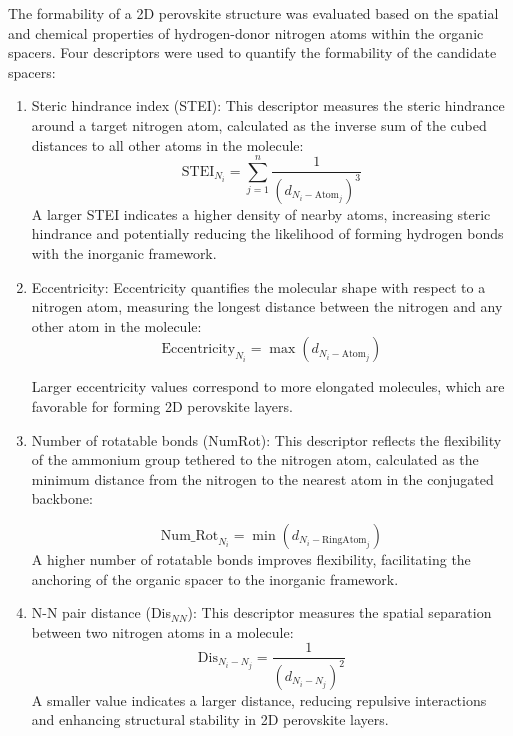 The formability of a 2D perovskite structure was evaluated based on the spatial and chemical properties of hydrogen-donor nitrogen atoms within the organic spacers. Four descriptors were used to quantify the formability of the candidate spacers:
\begin{enumerate}

    \item Steric hindrance index (STEI): This descriptor measures the steric hindrance around a target nitrogen atom, calculated as the inverse sum of the cubed distances to all other atoms in the molecule:
    \begin{equation}
        \text{STEI}_{N_i} = \sum_{j=1}^n \frac{1}{\left(d_{N_i - \text{Atom}_j}\right)^3}
    \end{equation}
A larger STEI indicates a higher density of nearby atoms, increasing steric hindrance and potentially reducing the likelihood of forming hydrogen bonds with the inorganic framework.
    \item Eccentricity: Eccentricity quantifies the molecular shape with respect to a nitrogen atom, measuring the longest distance between the nitrogen and any other atom in the molecule:
    \begin{equation}
        \text{Eccentricity}_{N_i} = \max\left(d_{N_i - \text{Atom}_j}\right)
    \end{equation}

Larger eccentricity values correspond to more elongated molecules, which are favorable for forming 2D perovskite layers.
	\item Number of rotatable bonds (NumRot): This descriptor reflects the flexibility of the ammonium group tethered to the nitrogen atom, calculated as the minimum distance from the nitrogen to the nearest atom in the conjugated backbone:

    \begin{equation}
        \text{Num\_Rot}_{N_i} = \min\left(d_{N_i - \text{RingAtom}_j}\right)
    \end{equation}
A higher number of rotatable bonds improves flexibility, facilitating the anchoring of the organic spacer to the inorganic framework.
	\item N-N pair distance (Dis$_{NN}$): This descriptor measures the spatial separation between two nitrogen atoms in a molecule:
    \begin{equation}
        \text{Dis}_{N_i - N_j} = \frac{1}{\left(d_{N_i - N_j}\right)^2}
    \end{equation}
A smaller value indicates a larger distance, reducing repulsive interactions and enhancing structural stability in 2D perovskite layers.
\end{enumerate}


